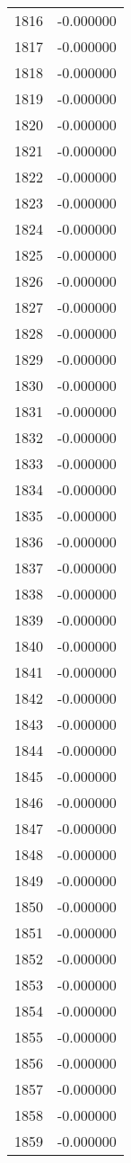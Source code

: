 \documentclass[12pt]{article}
\begin{document}
\begin{longtable}{@{}cc@{}}
1816 & -0.000000 \\
1817 & -0.000000 \\
1818 & -0.000000 \\
1819 & -0.000000 \\
1820 & -0.000000 \\
1821 & -0.000000 \\
1822 & -0.000000 \\
1823 & -0.000000 \\
1824 & -0.000000 \\
1825 & -0.000000 \\
1826 & -0.000000 \\
1827 & -0.000000 \\
1828 & -0.000000 \\
1829 & -0.000000 \\
1830 & -0.000000 \\
1831 & -0.000000 \\
1832 & -0.000000 \\
1833 & -0.000000 \\
1834 & -0.000000 \\
1835 & -0.000000 \\
1836 & -0.000000 \\
1837 & -0.000000 \\
1838 & -0.000000 \\
1839 & -0.000000 \\
1840 & -0.000000 \\
1841 & -0.000000 \\
1842 & -0.000000 \\
1843 & -0.000000 \\
1844 & -0.000000 \\
1845 & -0.000000 \\
1846 & -0.000000 \\
1847 & -0.000000 \\
1848 & -0.000000 \\
1849 & -0.000000 \\
1850 & -0.000000 \\
1851 & -0.000000 \\
1852 & -0.000000 \\
1853 & -0.000000 \\
1854 & -0.000000 \\
1855 & -0.000000 \\
1856 & -0.000000 \\
1857 & -0.000000 \\
1858 & -0.000000 \\
1859 & -0.000000 \\

\end{longtable}
\end{document}
